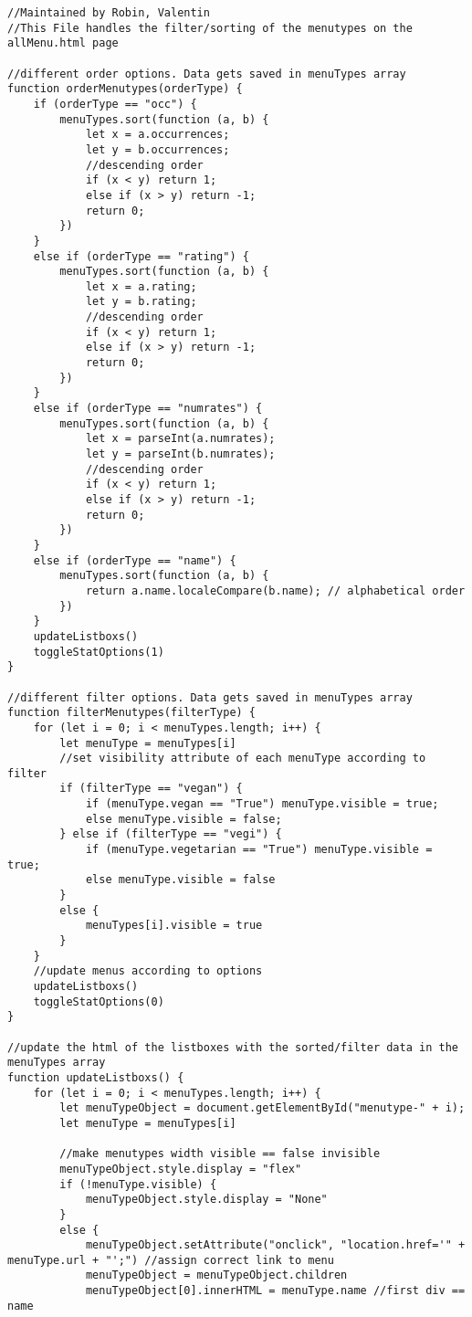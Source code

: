 \begin{lstlisting}
//Maintained by Robin, Valentin
//This File handles the filter/sorting of the menutypes on the allMenu.html page

//different order options. Data gets saved in menuTypes array
function orderMenutypes(orderType) {
    if (orderType == "occ") {
        menuTypes.sort(function (a, b) {
            let x = a.occurrences;
            let y = b.occurrences;
            //descending order
            if (x < y) return 1;
            else if (x > y) return -1;
            return 0;
        })
    }
    else if (orderType == "rating") {
        menuTypes.sort(function (a, b) {
            let x = a.rating;
            let y = b.rating;
            //descending order
            if (x < y) return 1;
            else if (x > y) return -1;
            return 0;
        })
    }
    else if (orderType == "numrates") {
        menuTypes.sort(function (a, b) {
            let x = parseInt(a.numrates);
            let y = parseInt(b.numrates);
            //descending order
            if (x < y) return 1;
            else if (x > y) return -1;
            return 0;
        })
    }
    else if (orderType == "name") {
        menuTypes.sort(function (a, b) {
            return a.name.localeCompare(b.name); // alphabetical order
        })
    }
    updateListboxs()
    toggleStatOptions(1)
}

//different filter options. Data gets saved in menuTypes array
function filterMenutypes(filterType) {
    for (let i = 0; i < menuTypes.length; i++) {
        let menuType = menuTypes[i]
        //set visibility attribute of each menuType according to filter
        if (filterType == "vegan") {
            if (menuType.vegan == "True") menuType.visible = true;
            else menuType.visible = false;
        } else if (filterType == "vegi") {
            if (menuType.vegetarian == "True") menuType.visible = true;
            else menuType.visible = false
        }
        else {
            menuTypes[i].visible = true
        }
    }
    //update menus according to options
    updateListboxs()
    toggleStatOptions(0)
}

//update the html of the listboxes with the sorted/filter data in the menuTypes array
function updateListboxs() {
    for (let i = 0; i < menuTypes.length; i++) {
        let menuTypeObject = document.getElementById("menutype-" + i);
        let menuType = menuTypes[i]

        //make menutypes width visible == false invisible
        menuTypeObject.style.display = "flex"
        if (!menuType.visible) {
            menuTypeObject.style.display = "None"
        }
        else {
            menuTypeObject.setAttribute("onclick", "location.href='" + menuType.url + "';") //assign correct link to menu
            menuTypeObject = menuTypeObject.children
            menuTypeObject[0].innerHTML = menuType.name //first div == name
            

\end{lstlisting}
